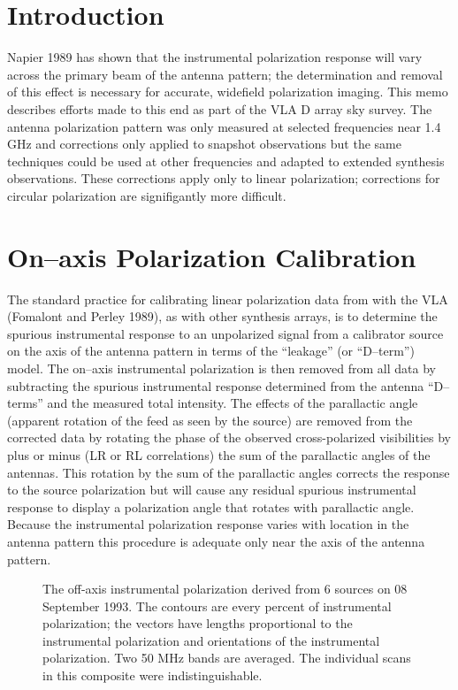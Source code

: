 \section {Introduction}

   Napier 1989 has shown that the instrumental polarization response
will vary across the primary beam of the antenna pattern;
the determination and removal of this effect is necessary for
accurate, widefield polarization imaging.
This memo describes efforts made to this end as part of
the VLA D array sky survey.  The antenna polarization pattern was only
measured at selected frequencies near 1.4 GHz and corrections
only applied to snapshot observations but the same techniques could be
used at other frequencies and adapted to extended synthesis
observations.  These corrections apply only to linear polarization;
corrections for circular polarization are signifigantly more difficult.

\section {On--axis Polarization Calibration}

   The standard practice for calibrating linear polarization data from
with the VLA (Fomalont and Perley 1989), as with other synthesis
arrays, is to determine the spurious instrumental response to an
unpolarized signal from a calibrator source on the axis of the antenna
pattern in terms of the ``leakage'' (or ``D--term'') model.
The on--axis instrumental polarization is then
removed from all data by subtracting the spurious instrumental
response determined  from the antenna ``D--terms'' and the measured
total intensity.
The effects of the parallactic angle (apparent rotation of
the feed as seen by the source) are removed from the corrected data by
rotating the phase of the observed cross-polarized visibilities by
plus or minus (LR or RL correlations) the sum of  the parallactic
angles of the antennas.
This rotation by the sum of the parallactic angles corrects the
response to the source polarization but will cause any residual
spurious instrumental response to display a polarization angle that
rotates with parallactic angle.
Because the instrumental polarization response varies
with location in the antenna pattern this procedure is adequate only
near the axis of the antenna pattern.

\begin{figure}
\centerline{}
\caption{
The off-axis instrumental polarization derived from 6 sources on 08
September 1993.  The contours are every percent of instrumental
polarization; the vectors have lengths proportional to the
instrumental polarization and orientations of the instrumental
polarization.
Two 50 MHz bands are averaged.
The individual scans in this composite were indistinguishable.
}
\label{avgpbeam}
\end{figure}

